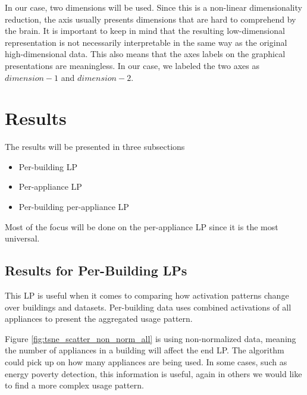 In our case, two dimensions will be used. Since this is a non-linear dimensionality reduction,
the axis usually presents dimensions that are hard to comprehend by the brain. 
It is important to keep in mind that the resulting low-dimensional representation is not necessarily interpretable in the same way as the original high-dimensional data.
This also means that the axes labels on the graphical presentations are meaningless.
In our case, we labeled the two axes as $dimension-1$ and $dimension-2$.

\section{Results}

The results will be presented in three subsections

\begin{itemize}
	\item Per-building LP
	\item Per-appliance LP
	\item Per-building per-appliance LP
\end{itemize}

Most of the focus will be done on the per-appliance LP since it is the most universal.

\subsection{Results for Per-Building LPs}
\label{ssec:res_pb_lp}
This LP is useful when it comes to comparing how 
activation patterns change over buildings and datasets.
Per-building data uses combined activations of all appliances to present 
the aggregated usage pattern.  

Figure \ref{fig:tsne_scatter_non_norm_all} is using non-normalized data, meaning
the number of appliances in a building will affect the end LP.
The algorithm could pick up on how many appliances are being used.
In some cases, such as energy poverty detection, this information is useful, 
again in others we would like to find a more complex usage pattern.

